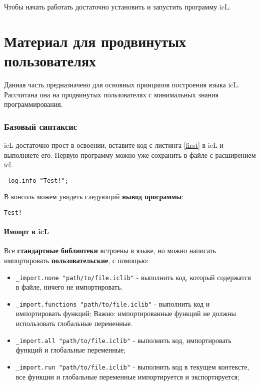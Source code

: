 \documentclass[a4paper, 14pt]{extarticle}
\newenvironment{icItems}
	{ \begin{itemize} [noitemsep,nolistsep] }
	{ \end{itemize} }
\begin{document}
Чтобы начать работать достаточно установить и запустить программу icL.

\newpage
\part{Материал для продвинутых пользователях}

Данная часть предназначено для основных принципов построения языка icL. Рассчитана она на продвинутых пользователях с минимальных знания программирования.

\section{Базовый синтаксис}

icL достаточно прост в освоении, вставите код с листинга \ref{first} в icL и выполняете его. Первую программу можно уже сохранить в файле с расширением icl.

\begin{lstlisting}[caption=Первая программа, label=first]
_log.info "Test!";
\end{lstlisting}

В консоль можем увидеть следующий \textbf{вывод программы}:

\begin{lstlisting}[numbers=none]
Test!
\end{lstlisting}

\subsection{Импорт в icL}

Все \textbf{стандартные библиотеки} встроены в языке, но можно написать импортировать \textbf{пользовательские}, с помощью:

\begin{icItems}
\item
	\lstinline|_import.none "path/to/file.iclib"| - выполнить код, который содержатся в файле, ничего не импортировать.
\item
	\lstinline|_import.functions "path/to/file.iclib"| - выполнить код и импортировать функций; {\color{red}Важно:} импортированные функций не должны использовать глобальные переменные.
\item
	\lstinline|_import.all "path/to/file.iclib"| -  выполнить код, импортировать функций и глобальные переменные;
\item
	\lstinline|_import.run "path/to/file.iclib"| - выполнить код в текущем контексте, все функции и глобальные переменные импортируется и экспортируется;
\end{icItems}
\end{document}

